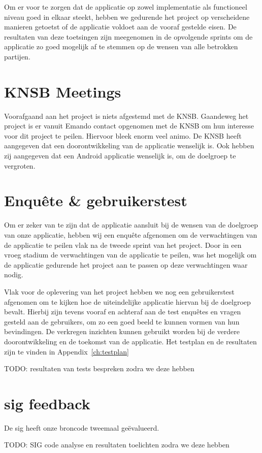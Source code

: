 Om er voor te zorgen dat de applicatie op zowel implementatie als functioneel niveau goed in elkaar steekt, hebben we gedurende het project op verscheidene manieren getoetst of de applicatie voldoet aan de vooraf gestelde eisen. De resultaten van deze toetsingen zijn meegenomen in de opvolgende sprints om de applicatie zo goed mogelijk af te stemmen op de wensen van alle betrokken partijen.

\section{KNSB Meetings}
Voorafgaand aan het project is niets afgestemd met de \ac{KNSB}. Gaandeweg het project is er vanuit Emando contact opgenomen met de \ac{KNSB} om hun interesse voor dit project te peilen. Hiervoor bleek enorm veel animo. De \ac{KNSB} heeft aangegeven dat een doorontwikkeling van de applicatie wenselijk is. Ook hebben zij aangegeven dat een Android applicatie wenselijk is, om de doelgroep te vergroten.

\section{Enquête \& gebruikerstest}
Om er zeker van te zijn dat de applicatie aansluit bij de wensen van de doelgroep van onze applicatie, hebben wij een enquête afgenomen om de verwachtingen van de applicatie te peilen vlak na de tweede sprint van het project. Door in een vroeg stadium de verwachtingen van de applicatie te peilen, was het mogelijk om de applicatie gedurende het project aan te passen op deze verwachtingen waar nodig. 

Vlak voor de oplevering van het project hebben we nog een gebruikerstest afgenomen om te kijken hoe de uiteindelijke applicatie hiervan bij de doelgroep bevalt. Hierbij zijn tevens vooraf en achteraf aan de test enquêtes en vragen gesteld aan de gebruikers, om zo een goed beeld te kunnen vormen van hun bevindingen. De verkregen inzichten kunnen gebruikt worden bij de verdere doorontwikkeling en de toekomst van de applicatie. Het testplan en de resultaten zijn te vinden in Appendix~\ref{ch:testplan}

{\par \bigskip \par \color{red} TODO: resultaten van tests bespreken zodra we deze hebben \par \bigskip \par }

\section{\acs{sig} feedback}

De \acf{sig} heeft onze broncode tweemaal geëvalueerd.

{\par \bigskip \par \color{red} TODO: SIG code analyse en resultaten toelichten zodra we deze hebben \par \bigskip \par }